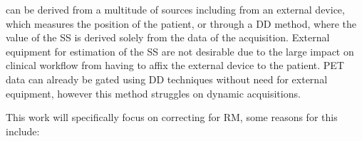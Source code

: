          can be derived from a multitude of sources including from an external device, which measures the position of the patient, or through a \gls{DD} method, where the value of the \gls{SS} is derived solely from the data of the acquisition. External equipment for estimation of the \gls{SS} are not desirable due to the large impact on clinical workflow from having to affix the external device to the patient. \gls{PET} data can already be gated using \gls{DD} techniques without need for external equipment, however this method struggles on dynamic acquisitions.%
            
        This work will specifically focus on correcting for \gls{RM}, some reasons for this include:
            
